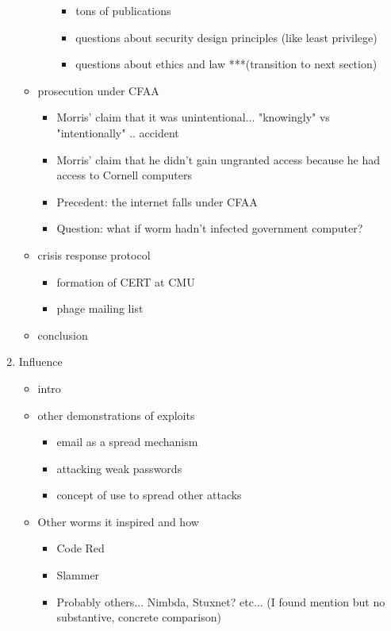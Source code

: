 \begin{enumerate}
\begin{itemize}
\begin{itemize}
\begin{itemize}
        	\item tons of publications
            \item questions about security design principles (like least privilege)
            \item questions about ethics and law ***(transition to next section)
        	\end{itemize}
		\end{itemize}
	\item prosecution under CFAA
    	\begin{itemize}
    	\item Morris' claim that it was unintentional... "knowingly" vs "intentionally"	.. accident
    	\item Morris' claim that he didn't gain ungranted access because he had access to Cornell computers
    	\item Precedent: the internet falls under CFAA
        \item Question: what if worm hadn't infected government computer?
    	\end{itemize}
    \item crisis response protocol
    	\begin{itemize}
    	\item formation of CERT at CMU
    	\item phage mailing list
    	\end{itemize}
    \item conclusion
    \end{itemize}
\item Influence
	\begin{itemize}
    \item intro
    \item other demonstrations of exploits
   		\begin{itemize}
   		\item email as a spread mechanism
        \item attacking weak passwords
        \item concept of use to spread other attacks  
   		\end{itemize} 
    \item Other worms it inspired and how
		\begin{itemize}
        \item Code Red
        \item Slammer
        \item Probably others... Nimbda, Stuxnet? etc... (I found mention but no substantive, concrete comparison)

\end{itemize}
\end{itemize}
\end{enumerate}
